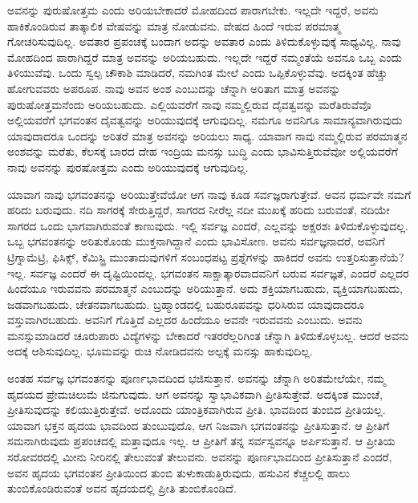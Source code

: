 ಅವನನ್ನು ಪುರುಷೋತ್ತಮ ಎಂದು ಅರಿಯಬೇಕಾದರೆ ಮೋಹದಿಂದ ಪಾರಾಗಬೇಕು. ಇಲ್ಲದೇ ಇದ್ದರೆ, ಅವನು ಹಾಕಿಕೊಂಡಿರುವ ತಾತ್ಕಾಲಿಕ ವೇಷವನ್ನು ಮಾತ್ರ ನೋಡುವನು. ವೇಷದ ಹಿಂದೆ ಇರುವ ಪರಮಾತ್ಮ ಗೋಚರಿಸುವುದಿಲ್ಲ. ಅವತಾರ ಪ್ರಪಂಚಕ್ಕೆ ಬಂದಾಗ ಅದನ್ನು ಅವತಾರ ಎಂದು ತಿಳಿದುಕೊಳ್ಳುವುಕ್ಕೆ ಸಾಧ್ಯವಿಲ್ಲ. ನಾವು ಮೋಹದಿಂದ ಪಾರಾಗಿದ್ದರೆ ಮಾತ್ರ ಅವನನ್ನು ಅರಿಯಬಹುದು. ಇಲ್ಲದೇ ಇದ್ದರೆ ನಮ್ಮಂತೆಯೆ ಅವನೂ ಒಬ್ಬ ಎಂದು ತಿಳಿಯುವೆವು. ಒಂದು ಸ್ವಲ್ಪ ಚೌಕಾಶಿ ಮಾಡಿದರೆ, ನಮಗಿಂತ ಮೇಲೆ ಎಂದು ಒಪ್ಪಿಕೊಳ್ಳುವೆವು. ಅದಕ್ಕಿಂತ ಹೆಚ್ಚು ಹೋಗುವವರು ಅಪರೂಪ. ನಾವು ಅವನ ಅಂಶ ಎಂಬುದನ್ನು ಚೆನ್ನಾಗಿ ಅರಿತಾಗ ಮಾತ್ರ ಅವನನ್ನು ಪುರುಷೋತ್ತಮನೆಂದು ಅರಿಯಬಹುದು. ಎಲ್ಲಿಯವರೆಗೆ ನಾವು ನಮ್ಮಲ್ಲಿರುವ ದೈವತ್ವವನ್ನು ಮರೆತಿರುವೆವೊ ಅಲ್ಲಿಯವರೆಗೆ ಭಗವಂತನ ದೈವತ್ವವನ್ನು ಅರಿಯುವುದಕ್ಕೆ ಆಗುವುದಿಲ್ಲ. ನಮಗೂ ಅವನಿಗೂ ಸಾಮಾನ್ಯವಾಗಿರುವುದು ಯಾವುದಾದರೂ ಒಂದನ್ನು ಅರಿತರೆ ಮಾತ್ರ ಅವನನ್ನು ಅರಿಯಲು ಸಾಧ್ಯ. ಯಾವಾಗ ನಾವು ನಮ್ಮಲ್ಲಿರುವ ಪರಮಾತ್ಮನ ಅಂಶವನ್ನು ಮರೆತು, ಕೆಲಸಕ್ಕೆ ಬಾರದ ದೇಹ ಇಂದ್ರಿಯ ಮನಸ್ಸು ಬುದ್ಧಿ ಎಂದು ಭಾವಿಸುತ್ತಿರುವೆವೋ ಅಲ್ಲಿಯವರೆಗೆ ನಾವು ಅವನನ್ನು ಪುರಷೋತ್ತಮ ಎಂದು ಅರಿಯುವುದಕ್ಕೆ ಆಗುವುದಿಲ್ಲ.

ಯಾವಾಗ ನಾವು ಭಗವಂತನನ್ನು ಅರಿಯುತ್ತೇವೆಯೋ ಆಗ ನಾವು ಕೂಡ ಸರ್ವಜ್ಞರಾಗುತ್ತೇವೆ. ಅವನ ಧರ್ಮವೇ ನಮಗೆ ಹರಿದು ಬರುವುದು. ನದಿ ಸಾಗರಕ್ಕೆ ಸೇರುತ್ತಿದ್ದರೆ, ಸಾಗರದ ನೀರೆಲ್ಲ ನದೀ ಮುಖಕ್ಕೆ ಹರಿದು ಬರುವಂತೆ, ನದಿಯೇ ಸಾಗರದ ಒಂದು ಭಾಗವಾಗಿರುವಂತೆ ಕಾಣುವುದು. ಇಲ್ಲಿ ಸರ್ವಜ್ಞ ಎಂದರೆ, ಎಲ್ಲವನ್ನು ಅಕ್ಷರಶಃ ತಿಳಿದುಕೊಳ್ಳುವುದಲ್ಲ. ಒಬ್ಬ ಭಗವಂತನನ್ನು ಅರಿತುಕೊಂಡು ಮುಕ್ತನಾಗಿದ್ದಾನೆ ಎಂದು ಭಾವಿಸೋಣ. ಅವನು ಸರ್ವಜ್ಞನಾದರೆ, ಅವನಿಗೆ ಟ್ರಿಗ್ನಾಮೆಟ್ರಿ, ಫಿಸಿಕ್ಸ್, ಕೆಮಿಸ್ಟ್ರಿ ಮುಂತಾದುವುಗಳಿಗೆ ಸಂಬಂಧಪಟ್ಟ ಪ್ರಶ್ನೆಗಳನ್ನು ಹಾಕಿದರೆ ಅವನು ಉತ್ತರಿಸುತ್ತಾನೆಯೆ? ಇಲ್ಲ. ಸರ್ವಜ್ಞ ಎಂದರೆ ಈ ದೃಷ್ಟಿಯಿಂದಲ್ಲ. ಭಗವಂತನ ಸಾಕ್ಷಾತ್ಕಾರವಾದವನಿಗೆ ಬರುವ ಸರ್ವಜ್ಞತೆ, ಎಂದರೆ ಎಲ್ಲದರ ಹಿಂದೆಯೂ ಇರುವವನು ಪರ\-ಮಾತ್ಮನೆ ಎಂಬುದನ್ನು ಅರಿಯುತ್ತಾನೆ. ಅದು ಶಕ್ತಿಯಾಗಬಹುದು, ವ್ಯಕ್ತಿಯಾಗಬಹುದು, ಜಡವಾಗಬಹುದು, ಚೇತನವಾಗಬಹುದು. ಬ್ರಹ್ಮಾಂಡದಲ್ಲಿ ಬಹುರೂಪವನ್ನು ಧರಿಸಿರುವ ಯಾವುದಾದರೂ ವಸ್ತುವಾಗಿರಬಹುದು. ಅವನಿಗೆ ಗೊತ್ತಿದೆ ಎಲ್ಲದರ ಹಿಂದೆಯೂ ಅವನೇ ಇರುವವನು ಎಂಬುದು. ಅವನು ಮನಸ್ಸುಮಾಡಿದರೆ ಚೂರುಪಾರು ವಿದ್ಯೆಗಳನ್ನು ಬೇಕಾದರೆ ಇತರರೆಲ್ಲರಿಗಿಂತ ಚೆನ್ನಾಗಿ ತಿಳಿದುಕೊಳ್ಳಬಲ್ಲ. ಆದರೆ ಅವನು ಅದಕ್ಕೆ ಆಶಿಸುವುದಿಲ್ಲ. ಭೂಮವನ್ನು ರುಚಿ ನೋಡಿದವನು ಅಲ್ಪಕ್ಕೆ ಮನಸ್ಸು ಹಾಕುವುದಿಲ್ಲ.

ಅಂತಹ ಸರ್ವಜ್ಞ ಭಗವಂತನನ್ನು ಪೂರ್ಣಭಾವದಿಂದ ಭಜಿಸುತ್ತಾನೆ. ಅವನನ್ನು ಚೆನ್ನಾಗಿ ಅರಿತಮೇಲೆಯೇ, ನಮ್ಮ ಹೃದಯದ ಪ್ರೇಮಚಿಲುಮೆ ಜಿನುಗುವುದು. ಆಗ ಅವನನ್ನು ಸ್ವಾಭಾವಿಕವಾಗಿ ಪ್ರೀತಿಸುತ್ತೇವೆ. ಅದಕ್ಕಿಂತ ಮುಂಚೆ, ಪ್ರೀತಿಸುವುದನ್ನು ಕಲಿಯುತ್ತಿರುತ್ತೇವೆ. ಅದೊಂದು ಯಾಂತ್ರಿಕವಾಗಿರುವ ಪ್ರೀತಿ. ಭಾವದಿಂದ ತುಂಬಿದ ಪ್ರೀತಿಯಲ್ಲ. ಯಾವಾಗ ಭಕ್ತನ ಹೃದಯ ಭಾವದಿಂದ ತುಂಬುವುದೊ, ಆಗ ನಿಜವಾಗಿ ಭಗವಂತನನ್ನು ಪ್ರೀತಿಸುತ್ತಾನೆ. ಆ ಪ್ರೀತಿಗೆ ಸಮನಾಗಿರುವುದು ಪ್ರಪಂಚದಲ್ಲಿ ಮತ್ತಾವುದೂ ಇಲ್ಲ. ಆ ಪ್ರೀತಿಗೆ ತನ್ನ ಸರ್ವಸ್ವವನ್ನೂ ಅರ್ಪಿಸುತ್ತಾನೆ. ಆ ಪ್ರೀತಿಯ ಸರೋವರದಲ್ಲಿ ಮೀನು ನೀರಿನಲ್ಲಿ ತೇಲುವಂತೆ ತೇಲುವನು. ಅವನನ್ನು ಪೂರ್ಣಭಾವದಿಂದ ಪ್ರೀತಿಸುತ್ತಾನೆ ಎಂದರೆ, ಅವನ ಹೃದಯ ಭಗವಂತನ ಪ್ರೀತಿಯಿಂದ ತುಂಬಿ ತುಳುಕಾಡುತ್ತಿರುವುದು. ಹಸುವಿನ ಕೆಚ್ಚಲಲ್ಲಿ ಹಾಲು ತುಂಬಿಕೊಂಡಿರುವಂತೆ ಅವನ ಹೃದಯದಲ್ಲಿ ಪ್ರೀತಿ ತುಂಬಿಕೊಂಡಿದೆ.

